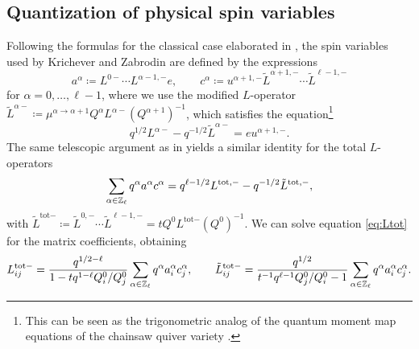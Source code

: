 \subsection{Quantization of physical spin variables}\label{sec:spinVars}

Following the formulas for  the classical case elaborated in \cite{arutyunov_spin_2026}, the spin variables used by Krichever and Zabrodin \cite{krichever_spin_1995} are defined by the expressions
\begin{equation}
    a^\alpha \coloneq L^{0-} \cdots L^{\alpha-1,-} e, \qquad c^\alpha \coloneq u^{\alpha+1,-} \tilde L^{\alpha+1,-} \cdots \tilde L^{\ell-1,-}
\end{equation}
for $\alpha = 0,\dots,\ell-1$, where we use the modified $L$-operator $\tilde L^{\alpha-} \coloneq \mu^{\alpha\to\alpha+1} Q^\alpha L^{\alpha-} (Q^{\alpha+1})^{-1}$, which satisfies the equation\footnote{This can be seen as the trigonometric analog of the quantum moment map equations of the chainsaw quiver variety \cite[equation (34)]{finkelberg_quantization_2014}.}
\begin{equation}
    q^{1/2} L^{\alpha-} - q^{-1/2} \tilde L^{\alpha-} = e u^{\alpha+1,-}.
\end{equation}
The same telescopic argument as in \cite{arutyunov_spin_2026} yields a similar identity for the total $L$-operators
\begin{equation}\label{eq:Ltot}
        \sum_{\alpha \in \mathbb{Z}_\ell} q^\alpha a^\alpha c^\alpha
        = q^{\ell-1/2} L^{\text{tot},-} - q^{-1/2} \tilde L^{\text{tot},-},
\end{equation}
with $\tilde L^{\text{tot}-} \coloneq \tilde L^{0,-} \cdots \tilde L^{\ell-1,-} = t Q^0 L^{\text{tot}-} (Q^0)^{-1}$. We can solve equation \eqref{eq:Ltot} for the matrix coefficients, obtaining
\begin{equation}
    L_{ij}^{\text{tot}-} = \frac{q^{1/2-\ell}}{1- tq^{1-\ell} Q_i^0/Q_j^0} \sum_{\alpha \in \mathbb{Z}_\ell} q^\alpha a_i^\alpha c_j^\alpha, \qquad \tilde L_{ij}^{\text{tot}-} = \frac{q^{1/2}}{t^{-1} q^{\ell-1} Q_j^0/Q_i^0-1} \sum_{\alpha \in \mathbb{Z}_\ell} q^\alpha a_i^\alpha c_j^\alpha.
\end{equation}

